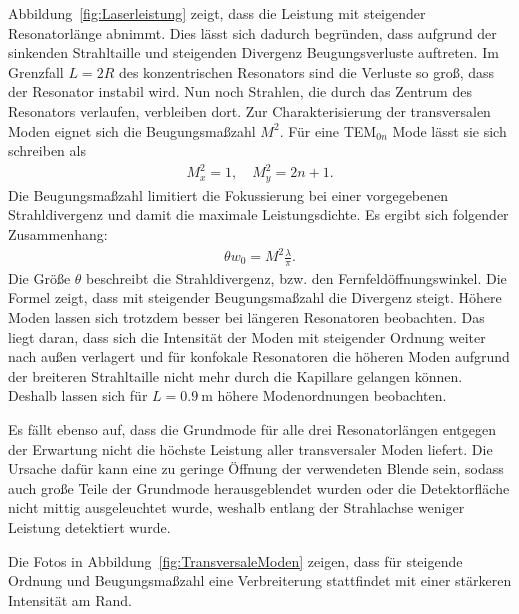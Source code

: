 \documentclass[a4paper,twoside,final]{article}
\begin{document}
Abbildung~\ref{fig:Laserleistung} zeigt, dass die Leistung mit steigender Resonatorlänge abnimmt. Dies lässt sich dadurch begründen, dass aufgrund der sinkenden Strahltaille und steigenden Divergenz Beugungsverluste auftreten. Im Grenzfall $L = 2R$ des konzentrischen Resonators sind die Verluste so groß, dass der Resonator instabil wird. Nun noch Strahlen, die durch das Zentrum des Resonators verlaufen, verbleiben dort. Zur Charakterisierung der transversalen Moden eignet sich die Beugungsmaßzahl $M^2$. Für eine TEM$_{0n}$ Mode lässt sie sich schreiben als~\cite{Eichler_strahlqualitaet}
\begin{align}
  M_x^2 = 1, \quad M_y^2 = 2n +1.
\end{align}
Die Beugungsmaßzahl limitiert die Fokussierung bei einer vorgegebenen Strahldivergenz und damit die maximale Leistungsdichte. Es ergibt sich folgender Zusammenhang:~\cite{Sigrist}
\begin{align}
  \theta w_0 = M^2 \frac{\lambda}{\pi}.
\end{align}
Die Größe $\theta$ beschreibt die Strahldivergenz, bzw. den Fernfeldöffnungswinkel. Die Formel zeigt, dass mit steigender Beugungsmaßzahl die Divergenz steigt. Höhere Moden lassen sich trotzdem besser bei längeren Resonatoren beobachten. Das liegt daran, dass sich die Intensität der Moden mit steigender Ordnung weiter nach außen verlagert und für konfokale Resonatoren die höheren Moden aufgrund der breiteren Strahltaille nicht mehr durch die Kapillare gelangen können. Deshalb lassen sich für $L=\SI{0.9}{\metre}$ höhere Modenordnungen beobachten.

Es fällt ebenso auf, dass die Grundmode für alle drei Resonatorlängen entgegen der Erwartung nicht die höchste Leistung aller transversaler Moden liefert. Die Ursache dafür kann eine zu geringe Öffnung der verwendeten Blende sein, sodass auch große Teile der Grundmode herausgeblendet wurden oder die Detektorfläche nicht mittig ausgeleuchtet wurde, weshalb entlang der Strahlachse weniger Leistung detektiert wurde.

Die Fotos in Abbildung~\ref{fig:TransversaleModen} zeigen, dass für steigende Ordnung und Beugungsmaßzahl eine Verbreiterung stattfindet mit einer stärkeren Intensität am Rand.
\end{document}
